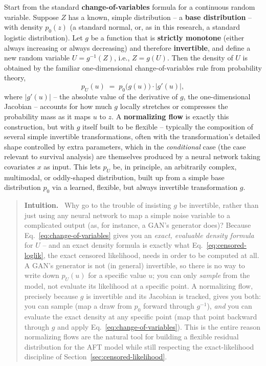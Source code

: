 \documentclass[11pt]{article}
\newenvironment{intuition}
  {\par\addvspace{8pt}\begin{quote}\noindent\textbf{\textcolor{blue!40!black}{Intuition.}}\ }
  {\end{quote}\par\addvspace{8pt}}
\begin{document}
Start from the standard \textbf{change-of-variables} formula for a
continuous random variable. Suppose $Z$ has a known, simple distribution
-- a \textbf{base distribution} -- with density $p_0(z)$ (a standard
normal, or, as in this research, a standard logistic distribution). Let
$g$ be a function that is \textbf{strictly monotone} (either always
increasing or always decreasing) and therefore \textbf{invertible}, and
define a new random variable $U = g^{-1}(Z)$, i.e., $Z = g(U)$. Then the
density of $U$ is obtained by the familiar one-dimensional
change-of-variables rule from probability theory,
\begin{equation}
  p_U(u) \;=\; p_0\bigl(g(u)\bigr) \cdot \bigl|g'(u)\bigr|,
  \label{eq:change-of-variables}
\end{equation}
where $|g'(u)|$ -- the absolute value of the derivative of $g$, the
one-dimensional Jacobian -- accounts for how much $g$ locally stretches
or compresses the probability mass as it maps $u$ to $z$. A
\textbf{normalizing flow} is exactly this construction, but with $g$
itself built to be flexible -- typically the composition of several
simple invertible transformations, often with the transformation's
detailed shape controlled by extra parameters, which in the
\emph{conditional} case (the case relevant to survival analysis) are
themselves produced by a neural network taking covariates $x$ as input.
This lets $p_U$ be, in principle, an arbitrarily complex, multimodal, or
oddly-shaped distribution, built up from a simple base distribution
$p_0$ via a learned, flexible, but always invertible transformation $g$.

\begin{intuition}
Why go to the trouble of insisting $g$ be invertible, rather than just
using any neural network to map a simple noise variable to a complicated
output (as, for instance, a GAN's generator does)? Because
Eq.~\eqref{eq:change-of-variables} gives you an \emph{exact, evaluable
density formula} for $U$ -- and an exact density formula is exactly what
Eq.~\eqref{eq:censored-loglik}, the exact censored likelihood, needs in
order to be computed at all. A GAN's generator is not (in general)
invertible, so there is no way to write down $p_U(u)$ for a specific
value $u$; you can only \emph{sample} from the model, not evaluate its
likelihood at a specific point. A normalizing flow, precisely because
$g$ is invertible and its Jacobian is tracked, gives you both: you can
sample (map a draw from $p_0$ forward through $g^{-1}$), \emph{and} you
can evaluate the exact density at any specific point (map that point
backward through $g$ and apply Eq.~\eqref{eq:change-of-variables}). This
is the entire reason normalizing flows are the natural tool for building
a flexible residual distribution for the AFT model while still
respecting the exact-likelihood discipline of
Section~\ref{sec:censored-likelihood}.
\end{intuition}
\end{document}
